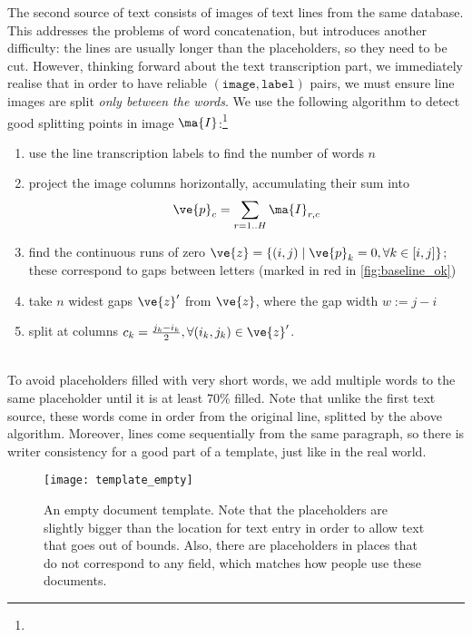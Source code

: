 			The second source of text consists of images of text lines from the same database. This addresses the problems of word concatenation, but introduces another difficulty: the lines are usually longer than the placeholders, so they need to be cut. However, thinking forward about the text transcription part, we immediately realise that in order to have reliable \((\mathtt{image}, \mathtt{label})\) pairs, we must ensure line images are split \emph{only between the words}. We use the following algorithm to detect good splitting points in image \(\ma{I}\):\footnote{} %
			\noindent\begin{minipage}{\linewidth}
			\begin{enumerate}
				\item use the line transcription labels to find the number of words \(n\)
				\item project the image columns horizontally, accumulating their sum into \[
					\ve{p}_c = \sum_{r = 1..H }\ma{I}_{r,c}
				\]
				\item find the continuous runs of zero \(\ve{z} = \{ (i, j) \mid \ve{p}_k = 0, \forall k \in [i, j] \}\); these correspond to gaps between letters (marked in red in \autoref{fig:baseline_ok})
				\item take \(n\) widest gaps \(\ve{z}'\) from \(\ve{z}\), where the gap width \(w := j - i\)
				\item split at columns \(c_k = \frac{j_k - i_k}{2}, \forall (i_k, j_k) \in \ve{z}'\).
			\end{enumerate}
			\end{minipage}
			\\

			To avoid placeholders filled with very short words, we add multiple words to the same placeholder until it is at least 70\% filled. Note that unlike the first text source, these words come in order from the original line, splitted by the above algorithm. Moreover, lines come sequentially from the same paragraph, so there is writer consistency for a good part of a template, just like in the real world.

			\begin{figure}
				\texttt{[image: template\_empty]}
				\caption[Document template]{An empty document template. Note that the placeholders are slightly bigger than the location for text entry in order to allow text that goes out of bounds. Also, there are placeholders in places that do not correspond to any field, which matches how people use these documents.}
				\label{fig:template}
			\end{figure}

